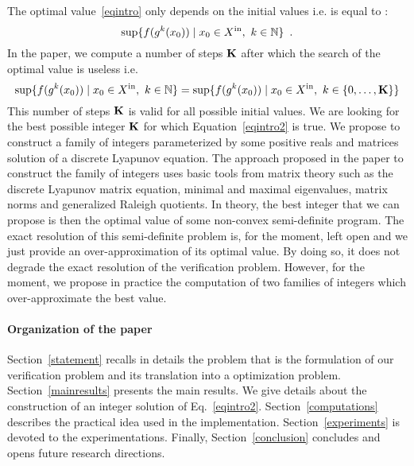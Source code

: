 \documentclass[10pt]{article}
\begin{document}
The optimal value~\eqref{eqintro} only depends on the initial values i.e. is equal to :
\[
\sup\{f( g^k (x_0))\mid  x_0\in X^\mathrm{in},\ k\in\mathbb{N}\}\enspace.
\]
In the paper, we compute a number of steps $\mathbf{K}$ after which the search of the optimal value is useless i.e.
 \begin{equation}
\label{eqintro2}
\sup\{f( g^k (x_0))\mid  x_0\in X^\mathrm{in},\ k\in\mathbb{N}\}=
\sup\{f( g^k (x_0))\mid  x_0\in X^\mathrm{in},\ k\in \{0,\ldots,\mathbf{K}\}\}
\end{equation}
This number of steps $\mathbf{K}$ is valid for all possible initial values. We are looking for the best possible integer $\mathbf{K}$ for which 
Equation~\eqref{eqintro2} is true. We propose to construct a family of integers parameterized by some positive reals and matrices solution of a discrete Lyapunov equation. The approach proposed in the paper to construct the family of integers uses basic tools from matrix theory such as the discrete Lyapunov matrix equation, minimal and maximal eigenvalues, matrix norms and generalized Raleigh quotients. In theory, the best integer that we can propose is then the optimal value of some non-convex semi-definite program.  
The exact resolution of this semi-definite problem is, for the moment, left open and we just provide an over-approximation of its optimal value. By doing so, it does not degrade the exact resolution of the verification problem.   However, for the moment, we propose in practice the computation of two families of integers which over-approximate the best value. 
%

\paragraph{Organization of the paper}
Section~\ref{statement} recalls in details the problem that is the formulation of our verification problem and its translation into a optimization problem. Section~\ref{mainresults} presents the main results. We give details about the construction of an integer solution of Eq.~\eqref{eqintro2}. Section~\ref{computations} describes the practical idea used in the implementation.  Section~\ref{experiments} is devoted to the experimentations. Finally, Section~\ref{conclusion} concludes and opens future research directions.
\end{document}
